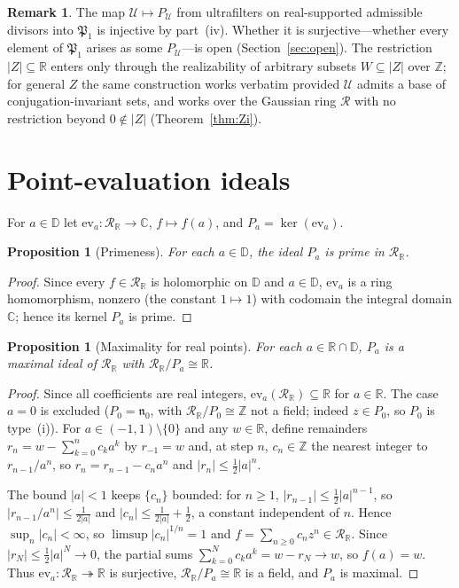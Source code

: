 \documentclass[12pt]{amsart}
\newtheorem{proposition}[theorem]{Proposition}
\theoremstyle{definition}
\newtheorem{remark}[theorem]{Remark}
\newcommand{\D}{\mathbb{D}}
\newcommand{\Z}{\mathbb{Z}}
\newcommand{\C}{\mathbb{C}}
\newcommand{\R}{\mathbb{R}}
\newcommand{\abs}[1]{\left|#1\right|}
\newcommand{\mR}{\mathcal{R}}
\newcommand{\mRR}{\mathcal{R}_{\mathbb{R}}}
\begin{document}
\begin{remark}
The map $\mathcal{U} \mapsto P_\mathcal{U}$ from ultrafilters on
real-supported admissible divisors into $\mathfrak{P}_1$ is injective by
part~(iv).  Whether it is surjective---whether every element of
$\mathfrak{P}_1$ arises as some $P_\mathcal{U}$---is open
(Section~\ref{sec:open}).  The restriction $|Z| \subseteq \R$ enters
only through the realizability of arbitrary subsets $W \subseteq |Z|$
over $\Z$; for general $Z$ the same construction works verbatim provided
$\mathcal{U}$ admits a base of conjugation-invariant sets, and works
over the Gaussian ring $\mR$ with no restriction beyond $0 \notin |Z|$
(Theorem~\ref{thm:Zi}).
\end{remark}

\section{Point-evaluation ideals}
\label{sec:pointeval}

For $a \in \D$ let $\mathrm{ev}_a \colon \mRR \to \C$, $f \mapsto f(a)$,
and $P_a = \ker(\mathrm{ev}_a)$.

\begin{proposition}[Primeness]
\label{prop:pointeval_prime}
For each $a \in \D$, the ideal $P_a$ is prime in $\mRR$.
\end{proposition}

\begin{proof}
Since every $f \in \mRR$ is holomorphic on $\D$ and $a \in \D$,
$\mathrm{ev}_a$ is a ring homomorphism, nonzero (the constant $1 \mapsto
1$) with codomain the integral domain $\C$; hence its kernel $P_a$ is
prime.
\end{proof}

\begin{proposition}[Maximality for real points]
\label{prop:pointeval_max_real}
For each $a \in \R \cap \D$, $P_a$ is a maximal ideal of $\mRR$ with
$\mRR/P_a \cong \R$.
\end{proposition}

\begin{proof}
Since all coefficients are real integers, $\mathrm{ev}_a(\mRR) \subseteq
\R$ for $a \in \R$.  The case $a = 0$ is excluded ($P_0 =
\mathfrak{n}_0$, with $\mRR/P_0 \cong \Z$ not a field; indeed $z \in
P_0$, so $P_0$ is type~(i)).  For $a \in (-1,1) \setminus \{0\}$ and any
$w \in \R$, define remainders $r_n = w - \sum_{k=0}^n c_k a^k$ by $r_{-1}
= w$ and, at step $n$, $c_n \in \Z$ the nearest integer to
$r_{n-1}/a^n$, so $r_n = r_{n-1} - c_n a^n$ and $\abs{r_n} \leq
\tfrac12\abs{a}^n$.

The bound $\abs{a} < 1$ keeps $\{c_n\}$ bounded: for $n \geq 1$,
$\abs{r_{n-1}} \leq \tfrac12\abs{a}^{n-1}$, so $\abs{r_{n-1}/a^n} \leq
\tfrac{1}{2\abs{a}}$ and $\abs{c_n} \leq \tfrac{1}{2\abs{a}} + \tfrac12$,
a constant independent of $n$.  Hence $\sup_n \abs{c_n} < \infty$, so
$\limsup \abs{c_n}^{1/n} = 1$ and $f = \sum_{n \geq 0} c_n z^n \in \mRR$.
Since $\abs{r_N} \leq \tfrac12\abs{a}^N \to 0$, the partial sums
$\sum_{k=0}^N c_k a^k = w - r_N \to w$, so $f(a) = w$.  Thus
$\mathrm{ev}_a \colon \mRR \twoheadrightarrow \R$ is surjective, $\mRR/P_a
\cong \R$ is a field, and $P_a$ is maximal.
\end{proof}
\end{document}
